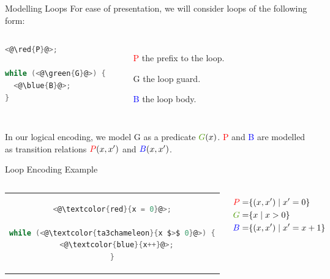 \documentclass[xcolor=pdftex,t,11pt]{beamer}
\newcommand{\red}[1]{\textcolor{red}{#1}}
\newcommand{\blue}[1]{\textcolor{blue}{#1}}
\newcommand{\green}[1]{\textcolor{ta3chameleon}{#1}}
\begin{document}
\begin{frame}[fragile]{Modelling Loops}
 For ease of presentation, we will consider loops of the following form:

 \begin{center}
 \begin{columns}[c]
  \begin{minipage}{\linewidth}
 \begin{lstlisting}[language=C,basicstyle=\normalsize]
<@\red{P}@>;

while (<@\green{G}@>) {
  <@\blue{B}@>;
}
 \end{lstlisting}
 \end{minipage}
 

 \begin{minipage}{\linewidth}
 \begin{itemize}
  \item[\red{P}] the prefix to the loop.
  \item[\green{G}] the loop guard.
  \item[\blue{B}] the loop body.
 \end{itemize}
 \end{minipage}
 \end{columns}

 \end{center}

\vspace{1em}
 
In our logical encoding, we model \green{G} as a predicate $\green{G}(x)$. \red{P} and \blue{B} are modelled as transition
relations $\red{P}(x, x')$ and $\blue{B}(x, x')$.
 
\end{frame}

\begin{frame}[fragile]{Loop Encoding Example}

\begin{columns}[c]

 \begin{center}
 \begin{tabular}{c}

 \begin{lstlisting}[language=C,basicstyle=\normalsize,mathescape]
<@\red{x = 0}@>;

while (<@\green{x $>$ 0}@>) {
  <@\blue{x++}@>;
}
 \end{lstlisting}
 \end{tabular}
 \end{center}

\begin{align*}
 \red{P} = & \{ (x, x') \mid x' = 0 \} \\
 \green{G} = & \{ x \mid x > 0 \} \\
 \blue{B} = & \{ (x, x') \mid x' = x + 1 \}
\end{align*}
\end{columns}

\end{frame}
\end{document}
